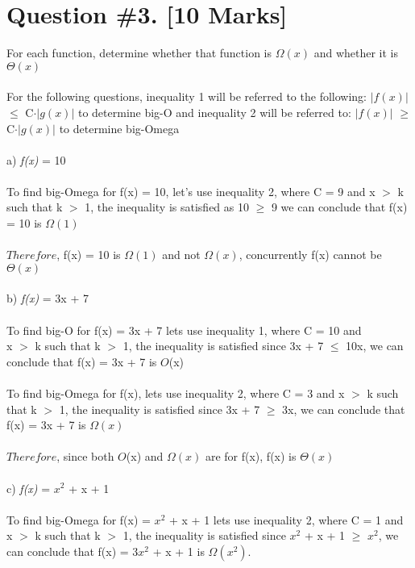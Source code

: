\documentclass{article}
\begin{document}
\section{Question \#3. [10 Marks]}
For each function, determine whether that function is $\Omega(x)$ and whether it is $\Theta(x)$\\ \\
For the following questions, inequality 1 will be referred to the following: $\left| f(x) \right|$ $\leq$ C$\cdot$$\left| g(x) \right|$ to determine big-O and inequality 2 will be referred to: $\left| f(x) \right|$ $\geq$ C$\cdot$$\left| g(x) \right|$ to determine big-Omega \\ \\
a) \textit{f(x)} = 10 \\ \\ 
To find big-Omega for f(x) = 10, let's use inequality 2, where C = 9 and x $>$ k such that k $>$ 1, the inequality is satisfied as 10 $\geq$ 9 we can conclude that f(x) = 10 is $\Omega(1)$ \\ \\ 
$Therefore$, f(x) = 10 is  $\Omega{(1)}$ and not $\Omega{(x)}$, concurrently f(x) cannot be $\Theta{(x)}$ \\ \\ 
b) \textit{f(x)} = 3x + 7 \\ \\ 
To find big-O for f(x) = 3x + 7 lets use inequality 1, where C = 10 and \\ x $>$ k such that k $>$ 1, the inequality is  satisfied since 3x + 7 $\leq$ 10x, we can conclude that f(x) = 3x + 7 is $O$(x) \\\\ 
To find big-Omega for f(x), lets use inequality 2, where C = 3 and x $>$ k such that k $>$ 1, the inequality is satisfied since 3x + 7 $\geq$ 3x, we can conclude that f(x) = 3x + 7 is $\Omega(x)$ \\ \\ 
$Therefore$, since both $O$(x) and $\Omega{(x)}$ are for f(x), f(x) is $\Theta{(x)}$ \\\\
c) \textit{f(x)} = $x^2$ + x + 1 \\  \\ 
To find big-Omega for f(x) = $x^2$ + x + 1 lets use inequality 2, where C = 1 and x $>$ k such that k $>$ 1, the inequality is  satisfied since $x^2$ + x + 1 $\geq$ $x^2$, we can conclude that f(x) = 3$x^2$ + x + 1 is $\Omega(x^2)$. \\\\ 
\end{document}
